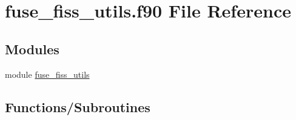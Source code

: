 \hypertarget{fuse__fiss__utils_8f90}{}\section{fuse\+\_\+fiss\+\_\+utils.\+f90 File Reference}
\label{fuse__fiss__utils_8f90}
\subsection*{Modules}
\begin{DoxyCompactItemize}
\item 
module \hyperlink{namespacefuse__fiss__utils}{fuse\+\_\+fiss\+\_\+utils}
\end{DoxyCompactItemize}
\subsection*{Functions/\+Subroutines}

